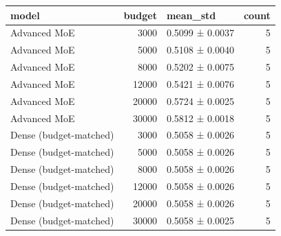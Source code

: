 \begin{tabular}{lrlr}
\toprule
model & budget & mean\_std & count \\
\midrule
Advanced MoE & 3000 & 0.5099 ± 0.0037 & 5 \\
Advanced MoE & 5000 & 0.5108 ± 0.0040 & 5 \\
Advanced MoE & 8000 & 0.5202 ± 0.0075 & 5 \\
Advanced MoE & 12000 & 0.5421 ± 0.0076 & 5 \\
Advanced MoE & 20000 & 0.5724 ± 0.0025 & 5 \\
Advanced MoE & 30000 & 0.5812 ± 0.0018 & 5 \\
Dense (budget-matched) & 3000 & 0.5058 ± 0.0026 & 5 \\
Dense (budget-matched) & 5000 & 0.5058 ± 0.0026 & 5 \\
Dense (budget-matched) & 8000 & 0.5058 ± 0.0026 & 5 \\
Dense (budget-matched) & 12000 & 0.5058 ± 0.0026 & 5 \\
Dense (budget-matched) & 20000 & 0.5058 ± 0.0026 & 5 \\
Dense (budget-matched) & 30000 & 0.5058 ± 0.0025 & 5 \\
\bottomrule
\end{tabular}
